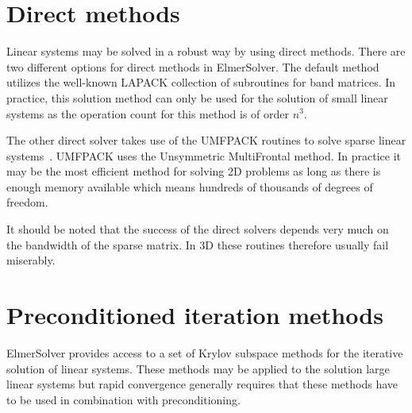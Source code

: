 %
 
 
\section{Direct methods}

Linear systems may be solved in a robust way by using direct methods. 
There are two different options for direct methods in ElmerSolver. 
The default method utilizes the well-known LAPACK collection
of subroutines for band matrices. In practice, 
this solution method can only be used for the solution of small linear systems as 
the operation count for this method is of order $n^3$.

The other direct solver takes use of the UMFPACK
routines to solve sparse linear systems~\cite{umfpack1}.
UMFPACK uses the Unsymmetric MultiFrontal method.
In practice it may be the most efficient method for solving 
2D problems as long as there is enough memory available
which means hundreds of thousands of degrees of freedom.

It should be noted that the success of the direct solvers 
depends very much on the bandwidth of the sparse matrix. 
In 3D these routines therefore usually fail miserably.


\section{Preconditioned iteration methods}

ElmerSolver provides access to a set of Krylov subspace methods for the 
iterative solution of linear systems. These methods may be applied to the
solution large linear systems but rapid convergence generally requires that 
these methods have to be used in combination with preconditioning.


